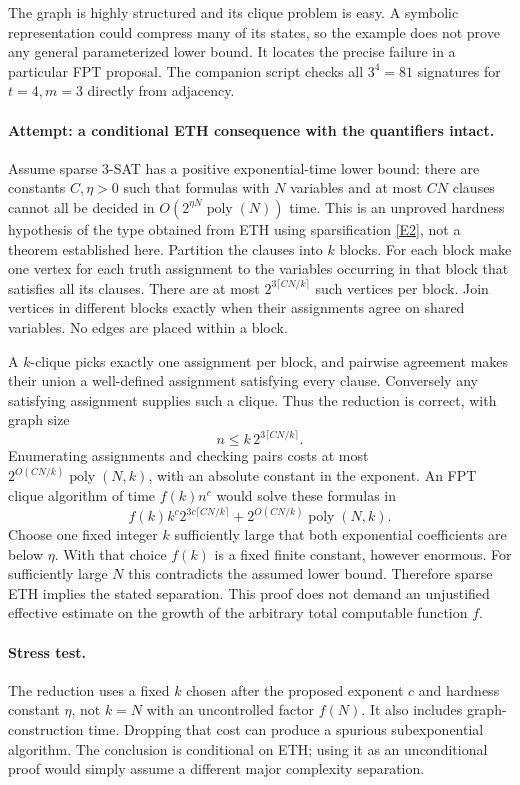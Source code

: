 \documentclass[11pt,a4paper]{article}
\numberwithin{equation}{section}
\newcommand{\eref}[2]{\hyperlink{extra:#1:#2}{[E#2]}}
\begin{document}
The graph is highly structured and its clique problem is easy. A symbolic
representation could compress many of its states, so the example does
not prove any general parameterized lower bound. It locates the precise
failure in a particular FPT proposal. The companion script checks all
$3^4=81$ signatures for $t=4,m=3$ directly from adjacency.

\paragraph{Attempt: a conditional ETH consequence with the quantifiers intact.}
Assume sparse 3-SAT has a positive exponential-time lower bound: there are
constants $C,\eta>0$ such that formulas with $N$ variables and at most
$CN$ clauses cannot all be decided in $O(2^{\eta N}\operatorname{poly}(N))$
time. This is an unproved hardness hypothesis of the type obtained from
ETH using sparsification \eref{statement}{2}, not a theorem established here.
Partition the clauses into $k$ blocks. For each block make one vertex for
each truth assignment to the variables occurring in that block that
satisfies all its clauses. There are at most
$2^{3\lceil CN/k\rceil}$ such vertices per block. Join vertices in
different blocks exactly when their assignments agree on shared variables.
No edges are placed within a block.

A $k$-clique picks exactly one assignment per block, and pairwise agreement
makes their union a well-defined assignment satisfying every clause.
Conversely any satisfying assignment supplies such a clique. Thus the
reduction is correct, with graph size
\[
 n\leq k\,2^{3\lceil CN/k\rceil}.
\]
Enumerating assignments and checking pairs costs at most
$2^{O(CN/k)}\operatorname{poly}(N,k)$, with an absolute constant in the
exponent. An FPT clique algorithm of time $f(k)n^c$ would solve these
formulas in
\[
 f(k)k^c2^{3c\lceil CN/k\rceil}
       +2^{O(CN/k)}\operatorname{poly}(N,k).
\]
Choose one fixed integer $k$ sufficiently large that both exponential
coefficients are below $\eta$. With that choice $f(k)$ is a fixed finite
constant, however enormous. For sufficiently large $N$ this contradicts
the assumed lower bound. Therefore sparse ETH implies the stated
separation. This proof does not demand an unjustified effective estimate
on the growth of the arbitrary total computable function $f$.

\paragraph{Stress test.}
The reduction uses a fixed $k$ chosen after the proposed exponent $c$ and
hardness constant $\eta$, not $k=N$ with an uncontrolled factor $f(N)$.
It also includes graph-construction time. Dropping that cost can produce
a spurious subexponential algorithm. The conclusion is conditional on ETH;
using it as an unconditional proof would simply assume a different major
complexity separation.
\end{document}
